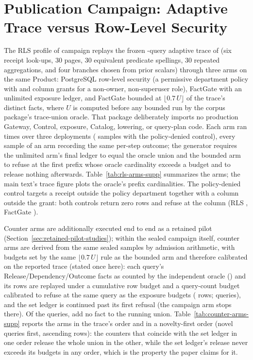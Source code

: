 \documentclass[journal,onecolumn]{IEEEtran}
\newcommand{\code}[1]{\texttt{\detokenize{#1}}}
\begin{document}
\section{Publication Campaign: Adaptive Trace versus Row-Level Security}
\label{sec:rls-publication-supp}

The RLS profile of campaign \FinalVFivePublicationCampaign{} replays the
frozen \FinalVFivePublicationRLSQueries{}-query adaptive trace of
 (six receipt look-ups, 30
pages, 30 equivalent predicate spellings, 30 repeated aggregations, and four
branches chosen from prior scalars) through three arms on the same
\code{expense_detail} Product: PostgreSQL row-level security (a permissive
department policy with \code{FORCE ROW LEVEL SECURITY} and column grants for a
non-owner, non-superuser role), FactGate with an unlimited exposure ledger, and FactGate
bounded at $\lfloor 0.7\,U\rfloor$ of the trace's distinct facts, where
$U$ is computed before any bounded run by the corpus package's trace-union
oracle. That package deliberately imports no production Gateway, Control,
exposure, Catalog, lowering, or query-plan code. Each arm ran
\FinalVFivePublicationRLSPerCell{} times over three deployments
(\FinalVFivePublicationRLSSamples{} samples with the policy-denied control),
every sample of an arm recording the same per-step outcome; the generator
requires the unlimited arm's final ledger to equal the oracle union and the
bounded arm to refuse at the first prefix whose oracle cardinality exceeds a
budget and to release nothing afterwards. Table~\ref{tab:rls-arms-supp}
summarizes the arms; the main text's trace figure plots the oracle's prefix
cardinalities. The policy-denied control targets a receipt
outside the policy department together with a column outside the grant: both
controls return zero rows and refuse at the column (RLS
\FinalVFivePublicationRLSControlErrorRLS{}, FactGate
\FinalVFivePublicationRLSControlErrorBDG{}).

Counter arms are additionally executed end to end as a retained pilot
(Section~\ref{sec:retained-pilot-studies}); within the sealed campaign
itself, counter arms are derived from the same sealed samples by admission
arithmetic, with budgets set by the same $\lfloor 0.7\,U\rfloor$ rule as the bounded arm and therefore calibrated on the reported trace (stated once here): each query's Release/Dependency/Outcome facts as counted by the
independent oracle (\code{oracle_trace}) and its rows are replayed under a
cumulative row budget and a query-count budget calibrated to refuse at the
same query as the exposure budgets (\FinalVFivePublicationCounterRowBudget{}
rows; \FinalVFivePublicationRLSBoundedSuccessful{} queries), and the set
ledger is continued past its first refusal (the campaign arm stops there).
Of the \FinalVFivePublicationRLSQueries{} queries,
\FinalVFivePublicationTraceZeroNoveltyQueries{} add no fact to the running
union. Table~\ref{tab:counter-arms-supp} reports the arms in the trace's
order and in a novelty-first order (novel queries first, ascending rows):
the counters that coincide with the set ledger in one order release the
whole union in the other, while the set ledger's release never exceeds its
budgets in any order, which is the property the paper claims for it.
\end{document}
